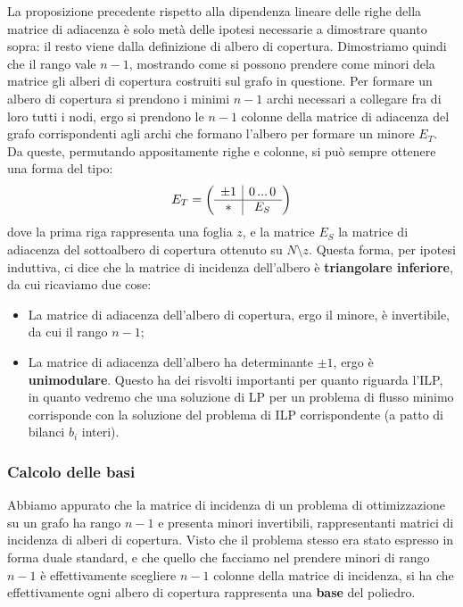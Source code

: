 \documentclass[a4paper,11pt]{article}
\begin{document}
La proposizione precedente rispetto alla dipendenza lineare delle righe della matrice di adiacenza è solo metà delle ipotesi necessarie a dimostrare quanto sopra: il resto viene dalla definizione di albero di copertura. 
Dimostriamo quindi che il rango vale $n-1$, mostrando come si possono prendere come minori dela matrice gli alberi di copertura costruiti sul grafo in questione.
Per formare un albero di copertura si prendono i minimi $n-1$ archi necessari a collegare fra di loro tutti i nodi, ergo si prendono le $n-1$ colonne della matrice di adiacenza del grafo corrispondenti agli archi che formano l'albero per formare un minore $E_T$.
Da queste, permutando appositamente righe e colonne, si può sempre ottenere una forma del tipo:
$$
E_T =
\left(\begin{array}{ c | c  }
		\pm 1 & 0 \, ... \,  0 \\
	\hline
		* & E_S
\end{array}\right)
$$
dove la prima riga rappresenta una foglia $z$, e la matrice $E_S$ la matrice di adiacenza del sottoalbero di copertura ottenuto su $N \setminus z$.
Questa forma, per ipotesi induttiva, ci dice che la matrice di incidenza dell'albero è \textbf{triangolare inferiore}, da cui ricaviamo due cose:
\begin{itemize}
	\item La matrice di adiacenza dell'albero di copertura, ergo il minore, è invertibile, da cui il rango $n-1$;
	\item La matrice di adiacenza dell'albero ha determinante $\pm 1$, ergo è \textbf{unimodulare}.
		Questo ha dei risvolti importanti per quanto riguarda l'ILP, in quanto vedremo che una soluzione di LP per un problema di flusso minimo corrisponde con la soluzione del problema di ILP corrispondente (a patto di bilanci $b_i$ interi).
\end{itemize}

\subsubsection{Calcolo delle basi}
Abbiamo appurato che la matrice di incidenza di un problema di ottimizzazione su un grafo ha rango $n-1$ e presenta minori invertibili, rappresentanti matrici di incidenza di alberi di copertura.
Visto che il problema stesso era stato espresso in forma duale standard, e che quello che facciamo nel prendere minori di rango $n-1$ è effettivamente scegliere $n-1$ colonne della matrice di incidenza, si ha che effettivamente ogni albero di copertura rappresenta una \textbf{base} del poliedro.
\end{document}
